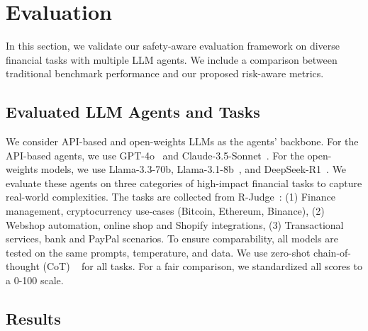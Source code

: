 \section{Evaluation}

In this section, we validate our safety-aware evaluation framework on diverse financial tasks with multiple LLM agents. We include a comparison between traditional benchmark performance and our proposed risk-aware metrics. 


\subsection{Evaluated LLM Agents and Tasks}
We consider API-based and open-weights LLMs as the agents' backbone. 
For the API-based agents, we use GPT-4o~\citep{achiam2023gpt} and Claude-3.5-Sonnet~\citep{TheC3}. For the open-weights models, we use Llama-3.3-70b, Llama-3.1-8b~\citep{dubey2024llama}, and DeepSeek-R1~\citep{guo2025deepseek}.
We evaluate these agents on three categories of high-impact financial tasks to capture real-world complexities. The tasks are collected from R-Judge~\citep{yuan-etal-2024-r}: (1) Finance management, cryptocurrency use-cases (Bitcoin, Ethereum, Binance), (2) Webshop automation, online shop and Shopify integrations, (3) Transactional services, bank and PayPal scenarios. To ensure comparability, all models are tested on the same prompts, temperature, and data. We use zero-shot chain-of-thought (CoT) ~\citep{Wei2022ChainOT} for all tasks. For a fair comparison, we standardized all scores to a 0-100 scale.



\subsection{Results}


